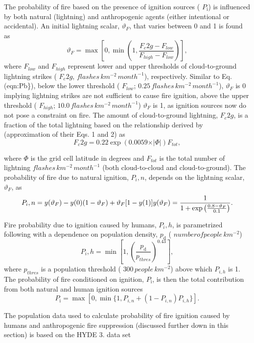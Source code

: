 The probability of fire based on the presence of ignition sources ( $P_\mathrm{i}$) is influenced by both natural (lightning) and anthropogenic agents (either intentional or accidental). An initial lightning scalar, $\vartheta_F$, that varies between 0 and 1 is found as \[ \vartheta_F = \max\left[0, \min \left(1,\frac{F_c2g - F_{low}}{F_{high} - F_{low}} \right)\right],\] where $F_{low}$ and $F_{high}$ represent lower and upper thresholds of cloud-\/to-\/ground lightning strikes ( $F_c2g$, $flashes\,km^{-2}\,month^{-1}$), respectively. Similar to Eq. (eqn\+:Pb\}), below the lower threshold ( $F_{low}$; $0.25\,flashes\,km^{-2}\,month^{-1}$), $\vartheta_F$ is 0 implying lightning strikes are not sufficient to cause fire ignition, above the upper threshold ( $F_{high}$; $10.0\,flashes\,km^{-2}\,month^{-1}$) $\vartheta_F$ is 1, as ignition sources now do not pose a constraint on fire. The amount of cloud-\/to-\/ground lightning, $F_c2g$, is a fraction of the total lightning based on the relationship derived by \cite{Price1993-fm} (approximation of their Eqs. 1 and 2) as \[ F_c2g = 0.22 \exp (0.0059 \times \vert {\Phi}\vert) F_{tot},\]

where $\Phi$ is the grid cell latitude in degrees and $F_{tot}$ is the total number of lightning $flashes\,km^{-2}\,month^{-1}$ (both cloud-\/to-\/cloud and cloud-\/to-\/ground). The probability of fire due to natural ignition, $P_i,n$, depends on the lightning scalar, $\vartheta_F$, as \[ P_i,n = y(\vartheta_F) - y(0)(1 - \vartheta_F) + \vartheta_F[1-y(1)] \nonumber\\ y(\vartheta_F) = \frac{1}{1 + \exp\left(\frac{0.8 - \vartheta_F}{0.1}\right)}. \]

Fire probability due to ignition caused by humans, $P_i,h$, is parametrized following \cite{Kloster2010-633} with a dependence on population density, $p_\mathrm{d}$ ( $number of people\,km^{-2}$) \[ \label{eqn:Ph} P_i,h = \min\left[1,\left(\frac{p_\mathrm{d}}{p_{thres}}\right)^{0.43}\right], \] where $p_{thres}$ is a population threshold ( $300\,people\,km^{-2}$) above which $P_{i,h}$ is 1. The probability of fire conditioned on ignition, $P_\mathrm{i}$, is then the total contribution from both natural and human ignition sources \[ \label{eqn:Pi} P_\mathrm{i} = \max[0, \min\{1, P_{i,n} + (1 - P_{i,n})P_{i,h}\}]. \]

The population data used to calculate probability of fire ignition caused by humans and anthropogenic fire suppression (discussed further down in this section) is based on the H\+Y\+D\+E 3. data set \cite{Klein_Goldewijk2010-lh}

